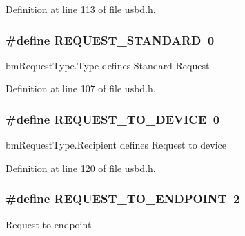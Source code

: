 Definition at line 113 of file usbd.\+h.

\subsubsection[{\texorpdfstring{R\+E\+Q\+U\+E\+S\+T\+\_\+\+S\+T\+A\+N\+D\+A\+RD}{REQUEST_STANDARD}}]{\setlength{\rightskip}{0pt plus 5cm}\#define R\+E\+Q\+U\+E\+S\+T\+\_\+\+S\+T\+A\+N\+D\+A\+RD~0}\hypertarget{group__USBD__Core_ga1dd6ef57678e7af95d835049d5b355b9}{}\label{group__USBD__Core_ga1dd6ef57678e7af95d835049d5b355b9}
bm\+Request\+Type.\+Type defines Standard Request 

Definition at line 107 of file usbd.\+h.

\subsubsection[{\texorpdfstring{R\+E\+Q\+U\+E\+S\+T\+\_\+\+T\+O\+\_\+\+D\+E\+V\+I\+CE}{REQUEST_TO_DEVICE}}]{\setlength{\rightskip}{0pt plus 5cm}\#define R\+E\+Q\+U\+E\+S\+T\+\_\+\+T\+O\+\_\+\+D\+E\+V\+I\+CE~0}\hypertarget{group__USBD__Core_gaf89871a0b4aa9411e09a9961de76e76f}{}\label{group__USBD__Core_gaf89871a0b4aa9411e09a9961de76e76f}
bm\+Request\+Type.\+Recipient defines Request to device 

Definition at line 120 of file usbd.\+h.

\subsubsection[{\texorpdfstring{R\+E\+Q\+U\+E\+S\+T\+\_\+\+T\+O\+\_\+\+E\+N\+D\+P\+O\+I\+NT}{REQUEST_TO_ENDPOINT}}]{\setlength{\rightskip}{0pt plus 5cm}\#define R\+E\+Q\+U\+E\+S\+T\+\_\+\+T\+O\+\_\+\+E\+N\+D\+P\+O\+I\+NT~2}\hypertarget{group__USBD__Core_ga4c4571ca0bf6b462bd8954a95456561c}{}\label{group__USBD__Core_ga4c4571ca0bf6b462bd8954a95456561c}
Request to endpoint 

